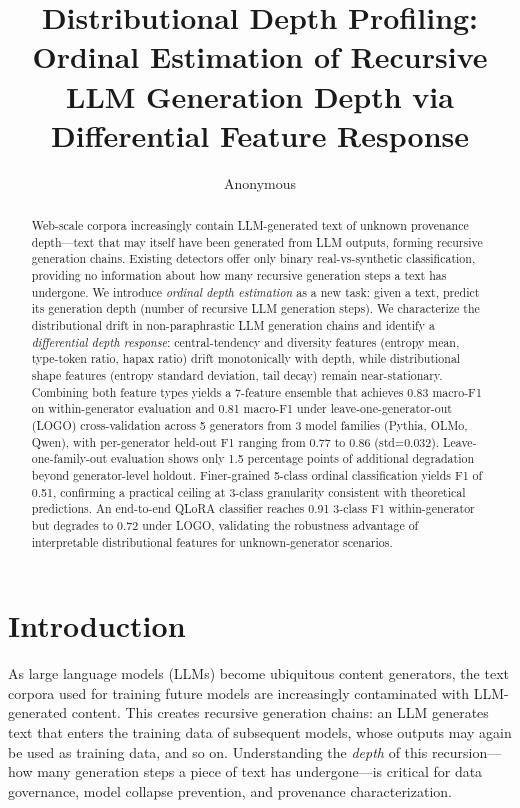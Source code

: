 \documentclass[11pt,a4paper]{article}
\title{Distributional Depth Profiling: Ordinal Estimation of Recursive LLM Generation Depth via Differential Feature Response}
\author{Anonymous}
\date{}
\begin{document}
\maketitle

\begin{abstract}
Web-scale corpora increasingly contain LLM-generated text of unknown provenance depth---text that may itself have been generated from LLM outputs, forming recursive generation chains. Existing detectors offer only binary real-vs-synthetic classification, providing no information about how many recursive generation steps a text has undergone. We introduce \emph{ordinal depth estimation} as a new task: given a text, predict its generation depth (number of recursive LLM generation steps). We characterize the distributional drift in non-paraphrastic LLM generation chains and identify a \emph{differential depth response}: central-tendency and diversity features (entropy mean, type-token ratio, hapax ratio) drift monotonically with depth, while distributional shape features (entropy standard deviation, tail decay) remain near-stationary. Combining both feature types yields a 7-feature ensemble that achieves 0.83 macro-F1 on within-generator evaluation and 0.81 macro-F1 under leave-one-generator-out (LOGO) cross-validation across 5 generators from 3 model families (Pythia, OLMo, Qwen), with per-generator held-out F1 ranging from 0.77 to 0.86 (std=0.032). Leave-one-family-out evaluation shows only 1.5 percentage points of additional degradation beyond generator-level holdout. Finer-grained 5-class ordinal classification yields F1 of 0.51, confirming a practical ceiling at 3-class granularity consistent with theoretical predictions. An end-to-end QLoRA classifier reaches 0.91 3-class F1 within-generator but degrades to 0.72 under LOGO, validating the robustness advantage of interpretable distributional features for unknown-generator scenarios.
\end{abstract}

\section{Introduction}

As large language models (LLMs) become ubiquitous content generators, the text corpora used for training future models are increasingly contaminated with LLM-generated content. This creates recursive generation chains: an LLM generates text that enters the training data of subsequent models, whose outputs may again be used as training data, and so on. Understanding the \emph{depth} of this recursion---how many generation steps a piece of text has undergone---is critical for data governance, model collapse prevention, and provenance characterization.
\end{document}
